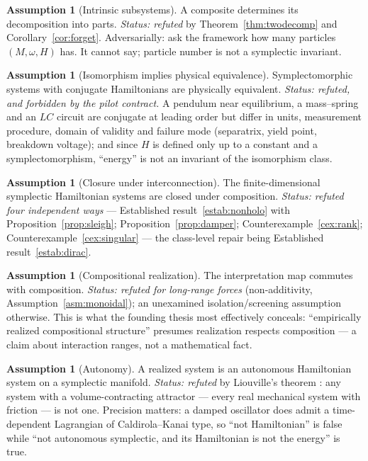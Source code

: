 \documentclass[12pt,a4paper]{article}
\theoremstyle{definition}
\newtheorem{assumption}[definition]{Assumption}
\theoremstyle{plain}
\theoremstyle{commentary}
\begin{document}
\begin{assumption}[Intrinsic subsystems]\label{asm:intrinsic}
A composite determines its decomposition into parts. \emph{Status: refuted} by
Theorem~\ref{thm:twodecomp} and Corollary~\ref{cor:forget}. Adversarially: ask the framework
how many particles $(M,\omega,H)$ has. It cannot say; particle number is not a symplectic
invariant.
\end{assumption}

\begin{assumption}[Isomorphism implies physical equivalence]\label{asm:iso}
Symplectomorphic systems with conjugate Hamiltonians are physically equivalent.
\emph{Status: refuted, and forbidden by the pilot contract.} A pendulum near equilibrium, a
mass--spring and an $LC$ circuit are conjugate at leading order but differ in units,
measurement procedure, domain of validity and failure mode (separatrix, yield point, breakdown
voltage); and since $H$ is defined only up to a constant and a symplectomorphism, ``energy''
is not an invariant of the isomorphism class.
\end{assumption}

\begin{assumption}[Closure under interconnection]\label{asm:closure}
The finite-dimensional symplectic Hamiltonian systems are closed under composition.
\emph{Status: refuted four independent ways} --- Established result~\ref{estab:nonholo} with
Proposition~\ref{prop:sleigh}; Proposition~\ref{prop:damper}; Counterexample~\ref{cex:rank};
Counterexample~\ref{cex:singular} --- the class-level repair being Established
result~\ref{estab:dirac}.
\end{assumption}

\begin{assumption}[Compositional realization]\label{asm:realization}
The interpretation map commutes with composition. \emph{Status: refuted for long-range forces}
(non-additivity, Assumption~\ref{asm:monoidal}); an unexamined isolation/screening assumption
otherwise. This is what the founding thesis most effectively conceals: ``empirically realized
compositional structure'' presumes realization respects composition --- a claim about
interaction ranges, not a mathematical fact.
\end{assumption}

\begin{assumption}[Autonomy]\label{asm:autonomy}
A realized system is an autonomous Hamiltonian system on a symplectic manifold.
\emph{Status: refuted} by Liouville's theorem \cite[\S16]{Arnold1989}: any system with a
volume-contracting attractor --- every real mechanical system with friction --- is not one.
Precision matters: a damped oscillator does admit a time-dependent Lagrangian of
Caldirola--Kanai type, so ``not Hamiltonian'' is false while ``not autonomous symplectic, and
its Hamiltonian is not the energy'' is true.
\end{assumption}
\end{document}
